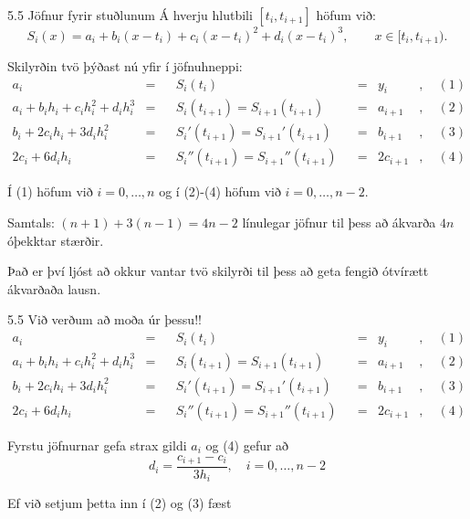 \begin{frame}{5.5 Jöfnur fyrir stuðlunum} 
Á hverju hlutbili $[t_i,t_{i+1}]$ höfum við:
\begin{equation*}
	S_i(x) = a_i+b_i(x-t_i)+c_i(x-t_i)^2+d_i(x-t_i)^3, 
		\qquad x\in [t_i,t_{i+1}).
\end{equation*}


\pause
Skilyrðin tvö þýðast nú yfir í jöfnuhneppi:
\begin{align*}
	a_i &=& &S_i(t_i)& &=& y_i  
		&, \quad (1) \\
	a_i + b_ih_i + c_ih_i^2 + d_ih_i^3 &=& &S_i(t_{i+1})
		= S_{i+1}(t_{i+1})& &=& a_{i+1} 
		&, \quad (2) \\
	b_i + 2c_ih_i + 3d_ih_i^2 &=& &S_i'(t_{i+1}) 
		= S_{i+1}'(t_{i+1})& &=& b_{i+1}
		&, \quad (3) \\
	2c_i + 6d_ih_i &=& &S_i''(t_{i+1})
		= S_{i+1}''(t_{i+1})& &=& 2c_{i+1}
		&, \quad (4)
\end{align*}

\pause
Í (1) höfum við $i = 0,\ldots,n$ og í (2)-(4) höfum við $i=0,\ldots,n-2$.  

\smallskip
Samtals:  $(n+1)+3(n-1)=4n-2$ línulegar jöfnur til þess að ákvarða 
$4n$ óþekktar stærðir.

\pause
\smallskip
Það er því ljóst að okkur vantar tvö skilyrði til þess að geta 
fengið ótvírætt ákvarðaða lausn. 
\end{frame}

\begin{frame}{5.5 Við verðum að moða úr þessu!!} 
\begin{align*}
	a_i &=& &S_i(t_i)& &=& y_i  
		&, \quad (1) \\
	a_i + b_ih_i + c_ih_i^2 + d_ih_i^3 &=& &S_i(t_{i+1})
		= S_{i+1}(t_{i+1})& &=& a_{i+1} 
		&, \quad (2) \\
	b_i + 2c_ih_i + 3d_ih_i^2 &=& &S_i'(t_{i+1}) 
		= S_{i+1}'(t_{i+1})& &=& b_{i+1}
		&, \quad (3) \\
	2c_i + 6d_ih_i &=& &S_i''(t_{i+1})
		= S_{i+1}''(t_{i+1})& &=& 2c_{i+1}
		&, \quad (4)
\end{align*}

Fyrstu jöfnurnar gefa strax gildi $a_i$ og (4) gefur að
\begin{equation*}
	d_i = \frac{c_{i+1}-c_i}{3h_i}, \quad i=0,\ldots,n-2
\end{equation*}

\pause
Ef við setjum þetta inn í (2) og (3) fæst
\end{frame}

